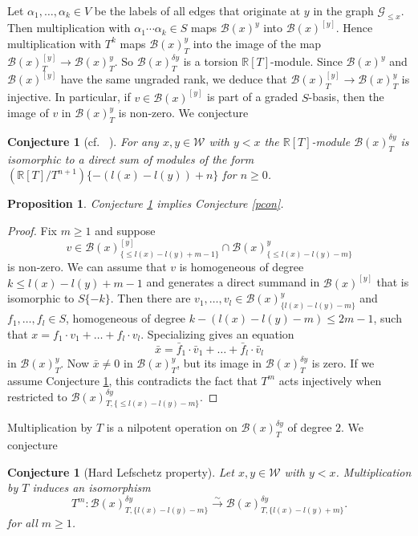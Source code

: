 \documentclass[12pt]{amsart}
\newtheorem{proposition}[theorem]{Proposition}
\newtheorem{conjecture}[theorem]{Conjecture}
\theoremstyle{definition}
\theoremstyle{remark}
\def\varle{\leqslant}
\newcommand{\CG}{{\mathcal G}}
\newcommand{\CW}{{\mathcal W}}
\newcommand{\SB}{{\mathscr B}}
\newcommand{\DR}{{\mathbb R}}
\begin{document}
Let $\alpha_1,\dots,\alpha_k\in V$ be the labels of all edges that originate at $y$ in the graph $\CG_{\leq x}$. Then multiplication with $\alpha_1\cdots\alpha_k\in S$ maps $\SB(x)^y$ into $\SB(x)^{[y]}$. Hence multiplication with $T^k$ maps $\SB(x)^y_T$ into the image of the map $\SB(x)^{[y]}_T\to\SB(x)^y_T$. So $\SB(x)^{\delta y}_T$ is a torsion $\DR[T]$-module. Since $\SB(x)^{y}$ and $\SB(x)^{[y]}$ have the same ungraded rank, we deduce that $\SB(x)^{[y]}_T\to\SB(x)^y_T$ is injective. In particular, if $v\in\SB(x)^{[y]}$ is part of a graded $S$-basis, then the image of $v$ in $\SB(x)^y_T$ is non-zero. We conjecture

\begin{conjecture}[cf.~ {\cite[Bemerkung 7.2]{Soe3}}]\label{p-dimone} For any $x,y\in\CW$ with $y<x$ the $\DR[T]$-module $\SB(x)^{\delta y}_T$ is isomorphic  to a direct sum of modules of the form $(\DR[T]/T^{n+1})\{-(l(x)-l(y))+n\}$ for $n\geq 0$. 
\end{conjecture}

\begin{proposition} Conjecture \ref{p-dimone} implies Conjecture \ref{pcon}.
\end{proposition}
\begin{proof} Fix  $m\geq 1$ and suppose  
$$
v\in \SB(x)^{[y]}_{\{\varle  l(x)-l(y)+m-1\}}\cap \SB(x)^y_{\{\varle  l(x)-l(y)-m\}}
$$ 
is non-zero. We can assume that  $v$ is homogeneous of degree $k\leq l(x)-l(y)+m-1$ and generates a direct summand in $\SB(x)^{[y]}$ that is isomorphic to $S\{-k\}$. Then there are $v_1,\dots, v_l\in\SB(x)^y_{\{l(x)-l(y)-m\}}$ and $f_1,\dots,f_l\in S$, homogeneous of degree $k-(l(x)-l(y)-m)\leq 2m-1$, such that $x=f_1\cdot v_1+\dots+f_l\cdot v_l$. Specializing gives an equation 
$$
\bar x=\bar f_1\cdot \bar v_1+\dots+\bar f_l\cdot \bar v_l
$$
in $\SB(x)^{y}_T$. Now $\bar x\neq 0$ in $\SB(x)^y_T$, but its image in $\SB(x)^{\delta y}_T$ is zero. If we assume Conjecture \ref{p-dimone}, this contradicts the fact that $T^m$  acts injectively when restricted to $\SB(x)^{\delta y}_{T,\{\varle  l(x)-l(y)-m\}}$. 
\end{proof}

Multiplication by $T$ is a nilpotent operation on $\SB(x)_T^{\delta y}$ of degree $2$. We conjecture

\begin{conjecture}[Hard Lefschetz property]\label{HLcon} Let $x,y\in\CW$ with $y<x$. Multiplication by $T$ induces an isomorphism
$$
T^{m}\colon \SB(x)^{\delta y}_{T,\{l(x)-l(y)-m\}}\stackrel{\sim}\to\SB(x)^{\delta y}_{T,\{l(x)-l(y)+m\}}.
$$
for all $m\geq 1$.
\end{conjecture}
\end{document}
